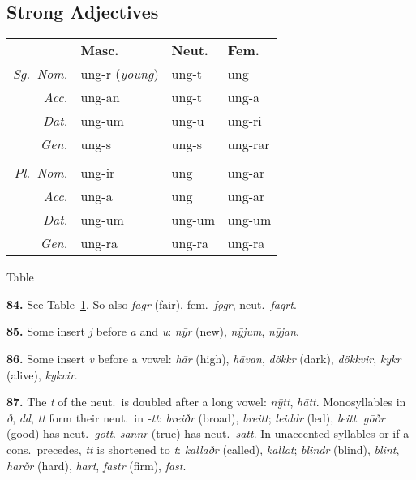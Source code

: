\documentclass[12pt,letterpaper]{book}
\newcommand\newcaption{\small\refstepcounter{table}%
	\centering Table~\thetable}
\begin{document}
\subsection{Strong Adjectives}

\begin{table}[htbp]
\begin{center}
\begin{tabular}{rlll}
	& \textbf{Masc.} & \textbf{Neut.} & \textbf{Fem.} \\
	\textit{Sg.\ Nom.} & ung-r (\textit{young}) & ung-t & ung \\
	\textit{Acc.} & ung-an & ung-t & ung-a \\
	\textit{Dat.} & ung-um & ung-u & ung-ri \\
	\textit{Gen.} & ung-s & ung-s & ung-rar \\
	\\
	\textit{Pl.\ Nom.} & ung-ir & ung & ung-ar \\
	\textit{Acc.} & ung-a & ung & ung-ar \\
	\textit{Dat.} & ung-um & ung-um & ung-um \\
	\textit{Gen.} & ung-ra & ung-ra & ung-ra \\
\end{tabular}
\end{center}
\newcaption
\label{tab:84}
\end{table}

\textbf{84.} See Table~\ref{tab:84}.  So also \textit{fagr} (fair),
fem.\ \textit{fǫgr}, neut.\ \textit{fagrt}.

\textbf{85.} Some insert \textit{j} before \textit{a} and \textit{u}: \textit{nȳr} (new),
\textit{nȳjum}, \textit{nȳjan}.

\textbf{86.} Some insert \textit{v} before a vowel: \textit{hār} (high), \textit{hāvan},
\textit{dökkr} (dark), \textit{dökkvir}, \textit{kykr} (alive), \textit{kykvir}.

\textbf{87.} The \textit{t} of the neut.\ is doubled after a long vowel: \textit{nȳtt},
\textit{hātt}.  Monosyllables in \textit{ð}, \textit{dd}, \textit{tt} form their neut.\ in
\textit{-tt}: \textit{breiðr} (broad), \textit{breitt}; \textit{leiddr} (led), \textit{leitt}.
\textit{gōðr} (good) has neut.\ \textit{gott}.  \textit{sannr} (true) has neut.\ \textit{satt}.
In unaccented syllables or if a cons.\ precedes, \textit{tt} is shortened
to \textit{t}: \textit{kallaðr} (called), \textit{kallat}; \textit{blindr} (blind),
\textit{blint}, \textit{harðr} (hard), \textit{hart}, \textit{fastr} (firm),
\textit{fast}.
\end{document}
